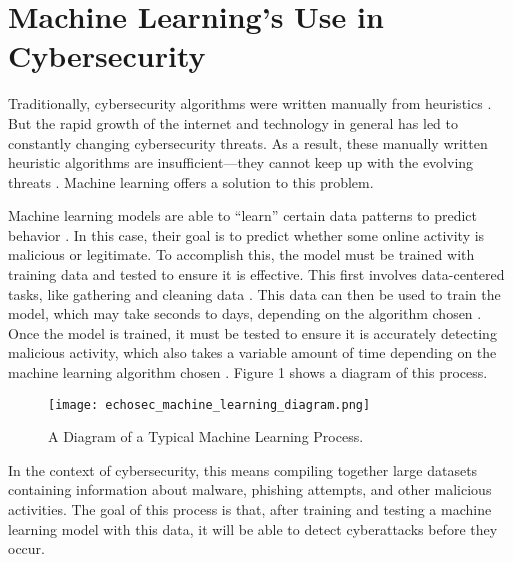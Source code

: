 \section{Machine Learning's Use in Cybersecurity}

Traditionally, cybersecurity algorithms were written manually from heuristics \cite{sarker_kayes_badsha_2020}.
But the rapid growth of the internet and technology in general has led to constantly changing cybersecurity threats.
As a result, these manually written heuristic algorithms are insufficient---they cannot keep up with the evolving threats \cite{sarker_kayes_badsha_2020}.
Machine learning offers a solution to this problem.

Machine learning models are able to ``learn'' certain data patterns to predict behavior \cite{sarker_kayes_badsha_2020}.
In this case, their goal is to predict whether some online activity is malicious or legitimate.
To accomplish this, the model must be trained with training data and tested to ensure it is effective.
This first involves data-centered tasks, like gathering and cleaning data \cite{sarker_kayes_badsha_2020}.
This data can then be used to train the model, which may take seconds to days, depending on the algorithm chosen \cite{xin2018}.
Once the model is trained, it must be tested to ensure it is accurately detecting malicious activity, which also takes a variable amount of time depending on the machine learning algorithm chosen \cite{xin2018}.
Figure 1 shows a diagram of this process.

\begin{figure}[H]
    \centering
    \texttt{[image: echosec\_machine\_learning\_diagram.png]}
    \caption[Diagram of Machine Learning Process]{A Diagram of a Typical Machine Learning Process. \cite{echosec}}
\end{figure}

In the context of cybersecurity, this means compiling together large datasets containing information about malware, phishing attempts, and other malicious activities.
The goal of this process is that, after training and testing a machine learning model with this data, it will be able to detect cyberattacks before they occur.


